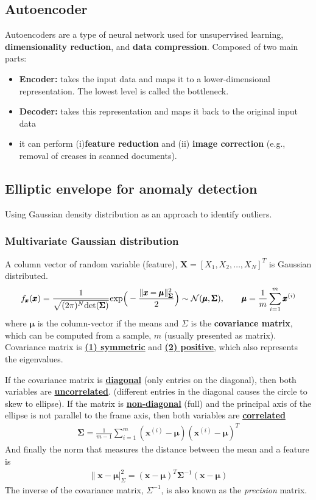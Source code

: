 \documentclass[a4paper,10pt]{article}
\begin{document}
\subsection{Autoencoder}
Autoencoders are a type of neural network used for unsupervised learning, \textbf{dimensionality reduction}, and \textbf{data compression}. Composed of two main parts:
\begin{itemize}
    \item \textbf{Encoder:} takes the input data and maps it to a lower-dimensional representation. The lowest level is called the bottleneck. 
    \item \textbf{Decoder:} takes this representation and maps it back to the original input data
    \item it can perform (i)\textbf{feature reduction} and (ii) \textbf{image correction} (e.g., removal of creases in scanned documents).
\end{itemize}

\subsection{Elliptic envelope for anomaly detection}
Using Gaussian density distribution as an approach to identify outliers. 
\subsubsection{Multivariate Gaussian distribution}
A column vector of random variable (feature), $\pmb{X} = [X_1, X_2, \dots, X_N]^T$ is Gaussian distributed. 
\begin{gather*}
    f_{\pmb{x}}(\pmb{x}) = \frac{1}{\sqrt{(2\pi)^N\text{det}(\pmb{\Sigma})}}\text{exp}\Big(-\frac{\lVert\pmb{x-\mu}\rVert^2_{\pmb{\Sigma}}}{2}\Big)\sim \mathcal{N}(\pmb{\mu},\pmb{\Sigma}) ,
    \hspace*{0.7cm}
    \pmb{\mu}=\frac{1}{m}\sum_{i=1}^{m}\pmb{x}^{(i)}
\end{gather*}
where $\pmb{\mu}$ is the column-vector if the means and $\Sigma$ is the \textbf{covariance matrix}, which can be computed from a sample, $m$ (usually presented as matrix). Covariance matrix is \underline{\textbf{(1) symmetric}} and \underline{\textbf{(2) positive}}, which also represents the eigenvalues.\par
If the covariance matrix is \underline{\textbf{diagonal}} (only entries on the diagonal), then both variables are \underline{\textbf{uncorrelated}}. (different entries in the diagonal causes the circle to skew to ellipse). If the matrix is \underline{\textbf{non-diagonal}} (full) and the principal axis of the ellipse is not parallel to the frame axis, then both variables are \underline{\textbf{correlated}}
\begin{gather*}
    \pmb{\Sigma} = \frac{1}{m-1}\sum_{i=1}^{m}(\pmb{x}^{(i)}-\pmb{\mu})(\pmb{x}^{(i)}-\pmb{\mu})^T
\end{gather*}
And finally the norm that measures the distance between the mean and a feature is
\begin{gather*}
    \lVert\pmb{x}-\pmb{\mu}\rvert^2_\Sigma = (\pmb{x}-\pmb{\mu})^T\pmb{\Sigma}^{-1}(\pmb{x}-\pmb{\mu})
\end{gather*}
The inverse of the covariance matrix, $\Sigma^{-1}$, is also known as the \textit{precision} matrix. 
\end{document}
